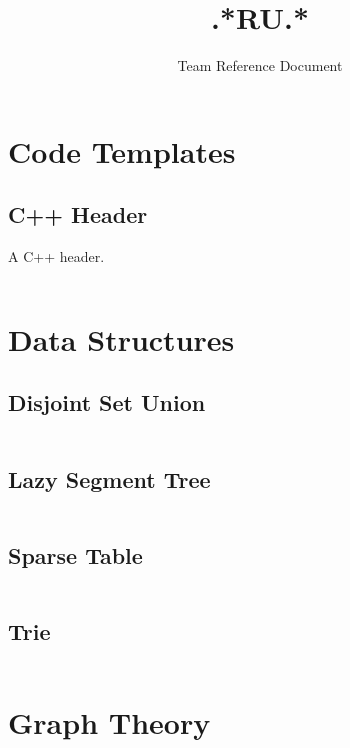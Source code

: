 \documentclass[8pt,a4paper,landscape,oneside]{amsart}
\title{.*RU.*}
\subtitle{Team Reference Document}
\date{\ddmmyyyydate{\today{}}}
\newcommand{\code}[1]{\inputminted[fontsize=\normalsize,baselinestretch=1]{cpp}{_code/#1}}
\begin{document}
\begin{multicols*}{3}
\maketitle
\thispagestyle{fancy}
\vspace{-3em}
\tableofcontents



\section{Code Templates}

    \subsection{C++ Header}
        A C++ header.
        \code{header.cpp}

\section{Data Structures}

	\subsection{Disjoint Set Union}
	
	\code{data-structures/dsu.cpp}
	
	\subsection{Lazy Segment Tree}
	
	\code{data-structures/lazy_segment_tree.cpp}
	
	\subsection{Sparse Table}
	
	\code{data-structures/sparse_table.cpp}
	
	\subsection{Trie}
	
	\code{data-structures/trie.cpp}

\section{Graph Theory}


\end{multicols*}
\end{document}
